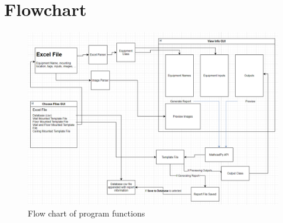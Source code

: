 \documentclass[11pt]{article}
\begin{document}
\section{Flowchart}
\label{sec:org5f35639}
\begin{figure}[htbp]
\centering
\includegraphics[width=.9\linewidth]{./dist/documentation/component_flowchart.png}
\caption{\label{fig:1}Flow chart of program functions}
\end{figure}
\end{document}
